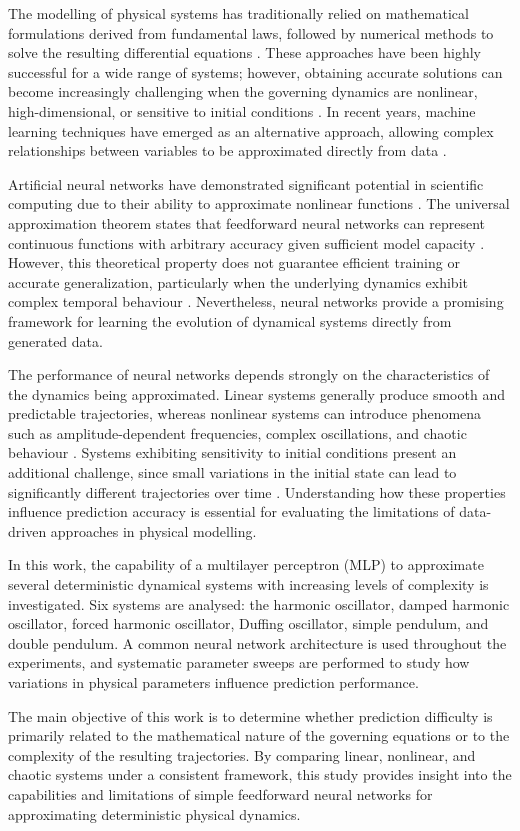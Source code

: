 The modelling of physical systems has traditionally relied on mathematical formulations derived from fundamental laws, followed by numerical methods to solve the resulting differential equations \cite{strogatz2015nonlinear}. These approaches have been highly successful for a wide range of systems; however, obtaining accurate solutions can become increasingly challenging when the governing dynamics are nonlinear, high-dimensional, or sensitive to initial conditions \cite{strogatz2015nonlinear}. In recent years, machine learning techniques have emerged as an alternative approach, allowing complex relationships between variables to be approximated directly from data \cite{brunton2019data}.

Artificial neural networks have demonstrated significant potential in scientific computing due to their ability to approximate nonlinear functions \cite{hornik1989multilayer}. The universal approximation theorem states that feedforward neural networks can represent continuous functions with arbitrary accuracy given sufficient model capacity \cite{hornik1989multilayer}. However, this theoretical property does not guarantee efficient training or accurate generalization, particularly when the underlying dynamics exhibit complex temporal behaviour \cite{goodfellow2016deep}. Nevertheless, neural networks provide a promising framework for learning the evolution of dynamical systems directly from generated data.

The performance of neural networks depends strongly on the characteristics of the dynamics being approximated. Linear systems generally produce smooth and predictable trajectories, whereas nonlinear systems can introduce phenomena such as amplitude-dependent frequencies, complex oscillations, and chaotic behaviour \cite{strogatz2015nonlinear}. Systems exhibiting sensitivity to initial conditions present an additional challenge, since small variations in the initial state can lead to significantly different trajectories over time \cite{lorenz1963deterministic}. Understanding how these properties influence prediction accuracy is essential for evaluating the limitations of data-driven approaches in physical modelling.

In this work, the capability of a multilayer perceptron (MLP) to approximate several deterministic dynamical systems with increasing levels of complexity is investigated. Six systems are analysed: the harmonic oscillator, damped harmonic oscillator, forced harmonic oscillator, Duffing oscillator, simple pendulum, and double pendulum. A common neural network architecture is used throughout the experiments, and systematic parameter sweeps are performed to study how variations in physical parameters influence prediction performance.

The main objective of this work is to determine whether prediction difficulty is primarily related to the mathematical nature of the governing equations or to the complexity of the resulting trajectories. By comparing linear, nonlinear, and chaotic systems under a consistent framework, this study provides insight into the capabilities and limitations of simple feedforward neural networks for approximating deterministic physical dynamics.